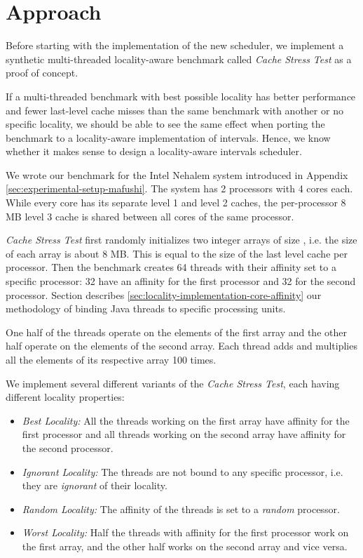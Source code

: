 
\chapter{Approach}
\label{chap:locality-approach}

Before starting with the implementation of the new scheduler, we
implement a synthetic multi-threaded locality-aware benchmark called
\emph{Cache Stress Test} as a proof of concept.

If a multi-threaded benchmark with best possible locality has better
performance and fewer last-level cache misses than the same benchmark
with another or no specific locality, we should be able to see the
same effect when porting the benchmark to a locality-aware
implementation of intervals. Hence, we know whether it makes sense to
design a locality-aware intervals scheduler.

We wrote our benchmark for the Intel Nehalem system introduced in
Appendix \ref{sec:experimental-setup-mafushi}. The system has 2
processors with 4 cores each. While every core has its separate level
1 and level 2 caches, the per-processor 8 MB level 3 cache is shared
between all cores of the same processor.

\emph{Cache Stress Test} first randomly initializes two integer arrays
of size , i.e. the size of each array is about 8
MB. This is equal to the size of the last level cache per
processor. Then the benchmark creates 64 threads with their affinity
set to a specific processor: 32 have an affinity for the first
processor and 32 for the second processor. Section describes
\ref{sec:locality-implementation-core-affinity} our methodology of
binding Java threads to specific processing units.

One half of the threads operate on the elements of the first array and
the other half operate on the elements of the second array. Each
thread adds and multiplies all the elements of its respective array
100 times.

We implement several different variants of the \emph{Cache Stress
  Test}, each having different locality properties:

\begin{itemize}
\item \emph{Best Locality:} All the threads working on the first array
  have affinity for the first processor and all threads working on the
  second array have affinity for the second processor.
\item \emph{Ignorant Locality:} The threads are not bound to any
  specific processor, i.e. they are \emph{ignorant} of their locality.
\item \emph{Random Locality:} The affinity of the threads is set to a
  \emph{random} processor.
\item \emph{Worst Locality:} Half the threads with affinity for the
  first processor work on the first array, and the other half works on
  the second array and vice versa.
\end{itemize}

